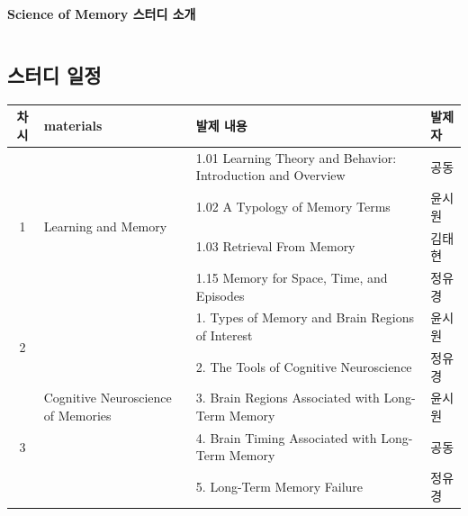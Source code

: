 \documentclass{beamer}
\begin{document}
\begin{frame}{\textbf{Science of Memory 스터디 소개}}
\begin{columns}
\begin{column}{0.6\textwidth}
      \subsection{스터디 일정}
      \begin{table}[]
        \centering
        \scriptsize
        \begin{tabularx}{\textwidth}{|c|p{1cm}|X|l|}
      \hline
      \textbf{차시}        & \textbf{materials}                                            & \textbf{발제 내용}                                                        & \textbf{발제자} \\ \hline
      \multirow{4}{*}{1} & \multirow{4}{*}{\parbox[c]{1cm}{Learning and Memory}}                 & 1.01 Learning Theory and Behavior: Introduction and Overview & 공동           \\ \cline{3-4} 
                         &                                                      & 1.02 A Typology of Memory Terms                              & 윤시원          \\ \cline{3-4} 
                         &                                                      & 1.03 Retrieval From Memory                                   & 김태현          \\ \cline{3-4} 
                         &                                                      & 1.15 Memory for Space, Time, and Episodes                    & 정유경          \\ \hline
      \multirow{2}{*}{2} & \multirow{11}{*}{\parbox[c]{1.1cm}{Cognitive Neuroscience of Memories}} & 1. Types of Memory and Brain Regions of Interest             & 윤시원          \\ \cline{3-4} 
                         &                                                      & 2. The Tools of Cognitive Neuroscience                       & 정유경          \\ \cline{1-1} \cline{3-4} 
      \multirow{3}{*}{3} &                                                      & 3. Brain Regions Associated with Long-Term Memory            & 윤시원          \\ \cline{3-4} 
                         &                                                      & 4. Brain Timing Associated with Long-Term Memory             & 공동           \\ \cline{3-4} 
                         &                                                      & 5. Long-Term Memory Failure                                  & 정유경          \\ \cline{1-1} \cline{3-4} 

\end{tabularx}
\end{table}
\end{column}
\end{columns}
\end{frame}
\end{document}
